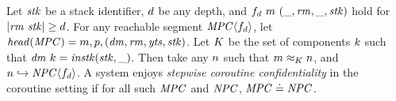 \documentclass[acmsmall,review,anonymous]{acmart}\settopmatter{printfolios=true,printccs=false,printacmref=false}
\begin{document}
 Let \(\mathit{stk}\) be a stack identifier, \(d\) be any depth, and
\(f_d ~ m ~ (\_, \mathit{rm}, \_, \mathit{stk})\) hold for \(|\mathit{rm} ~ \mathit{stk}| \geq d\).
For any reachable segment \(\mathit{MPC} \langle f_d \rangle\),
let \(\mathit{head}(\mathit{MPC}) = m,p,(\mathit{dm},\mathit{rm},\mathit{yts},\mathit{stk})\). Let
\(K\) be the set of components \(k\) such that
\(\mathit{dm} ~ k = \mathit{instk}(\mathit{stk},\_)\).
Then take any \(n\) such that \(m \approx_K n\), and
\(n \hookrightarrow \mathit{NPC}\langle f_d \rangle\). A system enjoys
{\em stepwise coroutine confidentiality} in the coroutine setting if for all
such \(\mathit{MPC}\) and \(\mathit{NPC}\), \(\mathit{MPC} \doteq \mathit{NPC}\).






\end{document}
